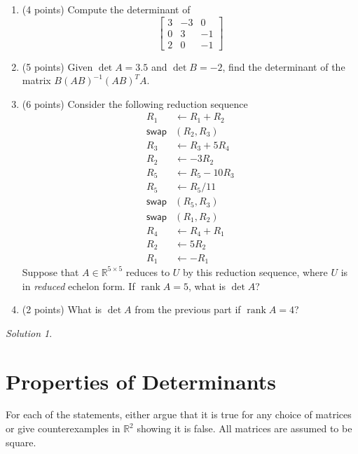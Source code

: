 \documentclass{article}
\theoremstyle{remark}
\newtheorem*{solution}{Solution}
\newcommand{\R}{\mathbb R}
\DeclareMathOperator{\rank}{rank}
\begin{document}
\begin{enumerate}
\item (4 points)
  Compute the determinant of
  \begin{displaymath}
    \begin{bmatrix}
      3 & -3 & 0 \\
      0 & 3 & -1 \\
      2 & 0 & -1
    \end{bmatrix}
  \end{displaymath}
\item (5 points) Given $\det A = 3.5$ and $\det B = -2$, find the determinant of the matrix $B(AB)^{-1}(AB)^TA$.
\item (6 points) Consider the following reduction sequence
  \begin{align*}
    R_1 &\gets R_1 + R_2 \\
    \mathsf{swap}&(R_2, R_3) \\
    R_3 &\gets R_3 + 5R_4 \\
    R_2 &\gets -3R_2 \\
    R_5 &\gets R_5 - 10R_3 \\
    R_5 &\gets R_5 / 11 \\
    \mathsf{swap}&(R_5, R_3) \\
    \mathsf{swap}&(R_1, R_2) \\
    R_4 &\gets R_4 + R_1 \\
    R_2 &\gets 5R_2 \\
    R_1 &\gets -R_1
  \end{align*}
  Suppose that $A \in \R^{5 \times 5}$ reduces to $U$ by this reduction sequence, where $U$ is in \textit{reduced} echelon form.
  If $\rank A = 5$, what is $\det A$?
\item (2 points)
  What is $\det A$ from the previous part if $\rank A = 4$?
\end{enumerate}


\medskip

\begin{solution}
\end{solution}

\pagebreak
\section{Properties of Determinants}

For each of the statements, either argue that it is true for any choice of matrices or give counterexamples in $\R^2$ showing it is false.
All matrices are assumed to be square.
\end{document}
